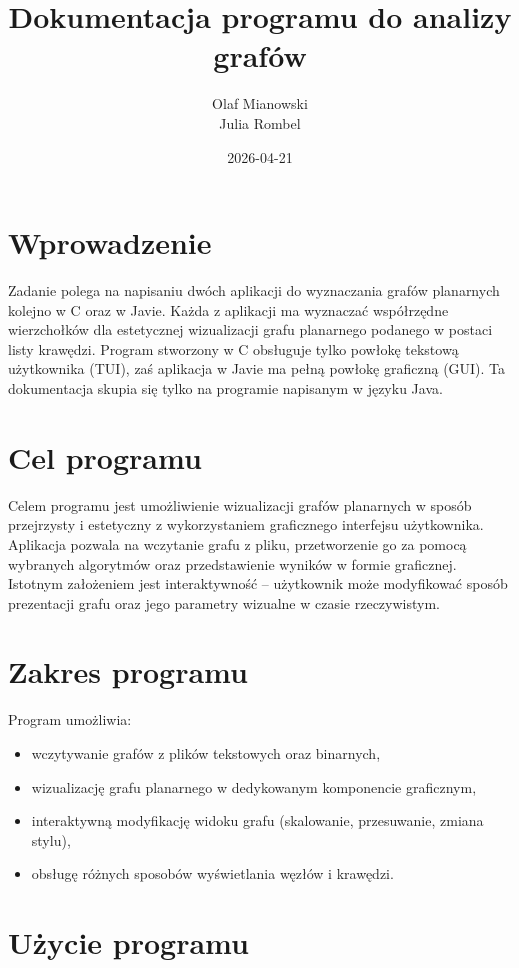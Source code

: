 \documentclass[11pt,a4paper]{article}
\title{Dokumentacja programu do analizy grafów}
\author{Olaf Mianowski \\ Julia Rombel}
\date{2026-04-21}
\begin{document}
\maketitle

\newpage

\tableofcontents

\newpage

\section{Wprowadzenie}
Zadanie polega na napisaniu dwóch aplikacji do wyznaczania grafów planarnych kolejno w C oraz w Javie. Każda z aplikacji ma wyznaczać współrzędne wierzchołków dla estetycznej wizualizacji grafu planarnego podanego w postaci listy krawędzi. Program stworzony w C obsługuje tylko powłokę tekstową użytkownika (TUI), zaś aplikacja w Javie ma pełną powłokę graficzną (GUI). Ta dokumentacja skupia się tylko na programie napisanym w języku Java.

\section{Cel programu}

Celem programu jest umożliwienie wizualizacji grafów planarnych w sposób przejrzysty i estetyczny z wykorzystaniem graficznego interfejsu użytkownika. Aplikacja pozwala na wczytanie grafu z pliku, przetworzenie go za pomocą wybranych algorytmów oraz przedstawienie wyników w formie graficznej. Istotnym założeniem jest interaktywność – użytkownik może modyfikować sposób prezentacji grafu oraz jego parametry wizualne w czasie rzeczywistym.

\section{Zakres programu}

Program umożliwia:
\begin{itemize}
    \item wczytywanie grafów z plików tekstowych oraz binarnych,
    \item wizualizację grafu planarnego w dedykowanym komponencie graficznym,
    \item interaktywną modyfikację widoku grafu (skalowanie, przesuwanie, zmiana stylu),
    \item obsługę różnych sposobów wyświetlania węzłów i krawędzi.
\end{itemize}

\section{Użycie programu}
\end{document}
